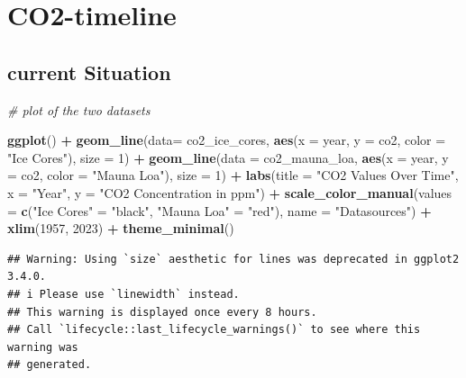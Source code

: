 \documentclass[
]{article}
\newenvironment{Shaded}{\begin{snugshade}}{\end{snugshade}}
\newcommand{\AttributeTok}[1]{\textcolor[rgb]{0.13,0.29,0.53}{#1}}
\newcommand{\CommentTok}[1]{\textcolor[rgb]{0.56,0.35,0.01}{\textit{#1}}}
\newcommand{\DecValTok}[1]{\textcolor[rgb]{0.00,0.00,0.81}{#1}}
\newcommand{\FunctionTok}[1]{\textcolor[rgb]{0.13,0.29,0.53}{\textbf{#1}}}
\newcommand{\NormalTok}[1]{#1}
\newcommand{\OtherTok}[1]{\textcolor[rgb]{0.56,0.35,0.01}{#1}}
\newcommand{\SpecialCharTok}[1]{\textcolor[rgb]{0.81,0.36,0.00}{\textbf{#1}}}
\newcommand{\StringTok}[1]{\textcolor[rgb]{0.31,0.60,0.02}{#1}}
\begin{document}
\hypertarget{co2-timeline}{%
\section{CO2-timeline}\label{co2-timeline}}

\hypertarget{current-situation}{%
\subsection{current Situation}\label{current-situation}}

\begin{Shaded}
\begin{Highlighting}[]
\CommentTok{\# plot of the two datasets}

\FunctionTok{ggplot}\NormalTok{() }\SpecialCharTok{+}
  \FunctionTok{geom\_line}\NormalTok{(}\AttributeTok{data=}\NormalTok{ co2\_ice\_cores, }\FunctionTok{aes}\NormalTok{(}\AttributeTok{x =}\NormalTok{ year, }\AttributeTok{y =}\NormalTok{ co2, }\AttributeTok{color =} \StringTok{"Ice Cores"}\NormalTok{), }\AttributeTok{size =} \DecValTok{1}\NormalTok{) }\SpecialCharTok{+}
  \FunctionTok{geom\_line}\NormalTok{(}\AttributeTok{data =}\NormalTok{ co2\_mauna\_loa, }\FunctionTok{aes}\NormalTok{(}\AttributeTok{x =}\NormalTok{ year, }\AttributeTok{y =}\NormalTok{ co2, }\AttributeTok{color =} \StringTok{"Mauna Loa"}\NormalTok{), }\AttributeTok{size =} \DecValTok{1}\NormalTok{) }\SpecialCharTok{+}
  \FunctionTok{labs}\NormalTok{(}\AttributeTok{title =} \StringTok{"CO2 Values Over Time"}\NormalTok{,}
       \AttributeTok{x =} \StringTok{"Year"}\NormalTok{,}
       \AttributeTok{y =} \StringTok{"CO2 Concentration in ppm"}\NormalTok{) }\SpecialCharTok{+}
  \FunctionTok{scale\_color\_manual}\NormalTok{(}\AttributeTok{values =} \FunctionTok{c}\NormalTok{(}\StringTok{"Ice Cores"} \OtherTok{=} \StringTok{"black"}\NormalTok{, }\StringTok{"Mauna Loa"} \OtherTok{=} \StringTok{"red"}\NormalTok{),}
                     \AttributeTok{name =} \StringTok{"Datasources"}\NormalTok{) }\SpecialCharTok{+}
  \FunctionTok{xlim}\NormalTok{(}\DecValTok{1957}\NormalTok{, }\DecValTok{2023}\NormalTok{) }\SpecialCharTok{+}
  \FunctionTok{theme\_minimal}\NormalTok{()}
\end{Highlighting}
\end{Shaded}

\begin{verbatim}
## Warning: Using `size` aesthetic for lines was deprecated in ggplot2 3.4.0.
## i Please use `linewidth` instead.
## This warning is displayed once every 8 hours.
## Call `lifecycle::last_lifecycle_warnings()` to see where this warning was
## generated.
\end{verbatim}
\end{document}
